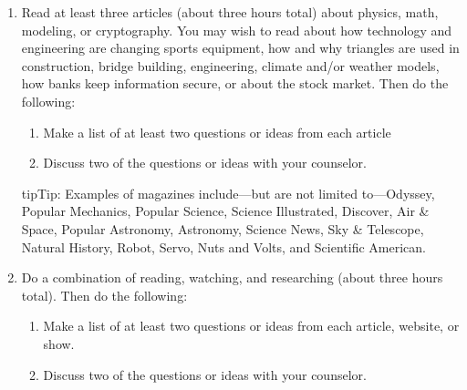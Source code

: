 \documentclass[letterpaper,10pt,english,openany,oneside]{sphinxmanual}
\begin{document}
\begin{enumerate}
\begin{enumerate}
\item {} 
Discuss wit hyour counselor how cryptography is used in the military and in everyday life and how a cryptographer uses mathematics.

\end{enumerate}

\begin{sphinxadmonition}{tip}{Tip:}
“The Mathematics of Cryptology”: University of Massachusetts Website: 
\end{sphinxadmonition}

\item {} 
Read at least three articles (about three hours total) about physics, math, modeling, or cryptography. You may wish to read about how technology and engineering are changing sports equipment, how and why triangles are used in construction, bridge building, engineering, climate and/or weather models, how banks keep information secure, or about the stock market. Then do the following:
\begin{enumerate}
%
\item {} 
Make a list of at least two questions or ideas from each article

\item {} 
Discuss two of the questions or ideas with your counselor.

\end{enumerate}

\begin{sphinxadmonition}{tip}{Tip:}
Examples of magazines include—but are not limited to—Odyssey, Popular Mechanics, Popular Science, Science Illustrated, Discover, Air \& Space, Popular Astronomy, Astronomy, Science News, Sky \& Telescope, Natural History, Robot, Servo, Nuts and Volts, and Scientific American.
\end{sphinxadmonition}

\item {} 
Do a combination of reading, watching, and researching (about three hours total). Then do the following:
\begin{enumerate}
%
\item {} 
Make a list of at least two questions or ideas from each article, website, or show.

\item {} 
Discuss two of the questions or ideas with your counselor.

\end{enumerate}

\end{enumerate}
\end{document}
